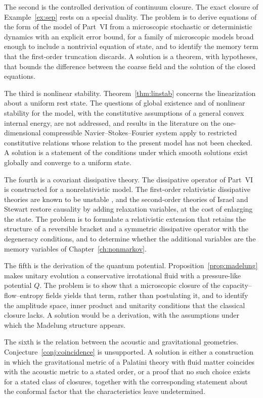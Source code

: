 \documentclass[11pt,oneside]{book}
\theoremstyle{definition}
\theoremstyle{remark}
\begin{document}
The second is the controlled derivation of continuum closure. The exact closure of Example~\ref{ex:sep} rests on a special duality. The problem is to derive equations of the form of the model of Part~VI from a microscopic stochastic or deterministic dynamics with an explicit error bound, for a family of microscopic models broad enough to include a nontrivial equation of state, and to identify the memory term that the first-order truncation discards. A solution is a theorem, with hypotheses, that bounds the difference between the coarse field and the solution of the closed equations.

The third is nonlinear stability. Theorem~\ref{thm:linstab} concerns the linearization about a uniform rest state. The questions of global existence and of nonlinear stability for the model, with the constitutive assumptions of a general convex internal energy, are not addressed, and results in the literature on the one-dimensional compressible Navier--Stokes--Fourier system apply to restricted constitutive relations whose relation to the present model has not been checked. A solution is a statement of the conditions under which smooth solutions exist globally and converge to a uniform state.

The fourth is a covariant dissipative theory. The dissipative operator of Part~VI is constructed for a nonrelativistic model. The first-order relativistic dissipative theories are known to be unstable \cite{hiscock1985}, and the second-order theories of Israel and Stewart \cite{israel1979} restore causality by adding relaxation variables, at the cost of enlarging the state. The problem is to formulate a relativistic extension that retains the structure of a reversible bracket and a symmetric dissipative operator with the degeneracy conditions, and to determine whether the additional variables are the memory variables of Chapter~\ref{ch:nonmarkov}.

The fifth is the derivation of the quantum potential. Proposition~\ref{prop:madelung} makes unitary evolution a conservative irrotational fluid with a pressure-like potential $Q$. The problem is to show that a microscopic closure of the capacity--flow--entropy fields yields that term, rather than postulating it, and to identify the amplitude space, inner product and unitarity conditions that the classical closure lacks. A solution would be a derivation, with the assumptions under which the Madelung structure appears.

The sixth is the relation between the acoustic and gravitational geometries. Conjecture~\ref{conj:coincidence} is unsupported. A solution is either a construction in which the gravitational metric of a Palatini theory with fluid matter coincides with the acoustic metric to a stated order, or a proof that no such choice exists for a stated class of closures, together with the corresponding statement about the conformal factor that the characteristics leave undetermined.
\end{document}
